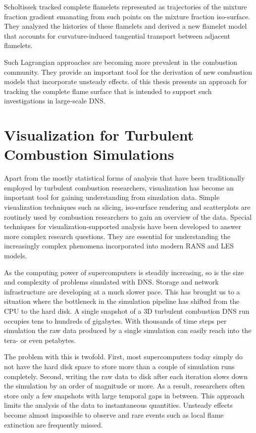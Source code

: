 %
Scholtissek \etal \cite{Scholtissek2017} tracked complete flamelets represented
as trajectories of the mixture fraction gradient emanating from such points on
the mixture fraction iso-surface.
%
They analyzed the histories of these flamelets and derived a new flamelet model
that accounts for curvature-induced tangential transport between adjacent
flamelets.
%

%
Such Lagrangian approaches are becoming more prevalent in the combustion
community.
%
They provide an important tool for the derivation of new combustion models
that incorporate unsteady effects.
%
 of this thesis presents an approach for
tracking the complete flame surface that is intended to support such
investigations in large-scale \ac{DNS}.
%
%
%
\section{Visualization for Turbulent Combustion Simulations} %
\label{sec:visualization_for_turbulent_combustion_simulations}
%
%
Apart from the mostly statistical forms of analysis that have been traditionally
employed by turbulent combustion researchers, visualization has become an
important tool for gaining understanding from simulation data.
%
Simple visualization techniques such as slicing, iso-surface rendering and
scatterplots are routinely used by combustion researchers to gain an overview of
the data.
%
Special techniques for visualization-supported analysis have been developed to
answer more complex research questions.
%
They are essential for understanding the increasingly complex phenomena
incorporated into modern \ac{RANS} and \ac{LES} models.
%

%
As the computing power of supercomputers is steadily increasing, so is the size
and complexity of problems simulated with \ac{DNS}.
%
Storage and network infrastructure are developing at a much slower pace.
%
This has brought us to a situation where the bottleneck in the simulation
pipeline has shifted from the \ac{CPU} to the hard disk.
%
A single snapshot of a \ac{3D} turbulent combustion \ac{DNS} run occupies tens
to hundreds of gigabytes.
%
With thousands of time steps per simulation the raw data produced by a single
simulation can easily reach into the tera- or even petabytes.
%

%
The problem with this is twofold.
%
First, most supercomputers today simply do not have the hard disk space to store
more than a couple of simulation runs completely.
%
Second, writing the raw data to disk after each iteration slows down the
simulation by an order of magnitude or more.
%
As a result, researchers often store only a few snapshots with large temporal
gaps in between.
%
This approach limits the analysis of the data to instantaneous quantities.
%
Unsteady effects become almost impossible to observe and rare events such as
local flame extinction are frequently missed.
%

